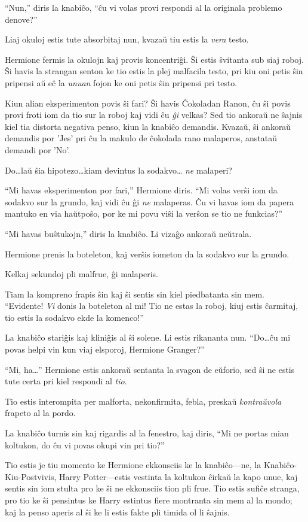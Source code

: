 ``Nun,'' diris la knabiĉo, ``ĉu vi volas provi respondi al la
originala problemo denove?''

Liaj okuloj estis tute absorbitaj nun, kvazaŭ tiu estis la \emph{vera}
testo.

Hermione fermis la okulojn kaj provis koncentriĝi. Ŝi estis ŝvitanta
sub siaj roboj. Ŝi havis la strangan senton ke tio estis la plej
malfacila testo, pri kiu oni petis ŝin pripensi aŭ eĉ la \emph{unuan}
fojon ke oni petis ŝin pripensi pri testo.

Kiun alian eksperimenton povis ŝi fari? Ŝi havis Ĉokoladan Ranon, ĉu
ŝi povis provi froti iom da tio sur la roboj kaj vidi ĉu \emph{ĝi}
velkas? Sed tio ankoraŭ ne ŝajnis kiel tia distorta negativa penso,
kiun la knabiĉo demandis. Kvazaŭ, ŝi ankoraŭ demandis por 'Jes' pri ĉu
la makulo de ĉokolada rano malaperos, anstataŭ demandi por 'No'.

Do\ldots laŭ ŝia hipotezo\ldots kiam devintus la sodakvo\ldots
\emph{ne} malaperi?

``Mi havas eksperimenton por fari,'' Hermione diris. ``Mi volas verŝi
iom da sodakvo sur la grundo, kaj vidi ĉu ĝi \emph{ne} malaperas. Ĉu
vi havas iom da papera mantuko en via haŭtpoŝo, por ke mi povu viŝi la
verŝon se tio ne funkcias?''

``Mi havas buŝtukojn,'' diris la knabiĉo. Li vizaĝo ankoraŭ neŭtrala.

Hermione prenis la boteleton, kaj verŝis iometon da la sodakvo sur la
grundo.

Kelkaj sekundoj pli malfrue, ĝi malaperis.

Tiam la kompreno frapis ŝin kaj ŝi sentis sin kiel piedbatanta sin
mem. ``Evidente! \emph{Vi} donis la boteleton al mi! Tio ne estas la
roboj, kiuj estis ĉarmitaj, tio estis la sodakvo ekde la komenco!''

La knabiĉo stariĝis kaj kliniĝis al ŝi solene. Li estis rikananta
nun. ``Do\ldots ĉu mi povas helpi vin kun viaj elsporoj, Hermione
Granger?''

``Mi, ha\ldots'' Hermione estis ankoraŭ sentanta la svagon de eŭforio,
sed ŝi ne estis tute certa pri kiel respondi al \emph{tio}.

Tio estis interompita per malforta, nekonfirmita, febla, preskaŭ
\emph{kontraŭvola} frapeto al la pordo.

La knabiĉo turnis sin kaj rigardis al la fenestro, kaj diris, ``Mi ne
portas mian koltukon, do ĉu vi povas okupi vin pri tio?''

Tio estis je tiu momento ke Hermione ekkonsciis ke la knabiĉo—ne, la
Knabiĉo-Kiu-Postvivis, Harry Potter—estis vestinta la koltukon ĉirkaŭ
la kapo unue, kaj sentis sin iom stulta pro ke ŝi ne ekkonsciis tion
pli frue. Tio estis sufiĉe stranga, pro tio ke ŝi pensintus ke Harry
estintus fiere montranta sin mem al la mondo; kaj la penso aperis al
ŝi ke li estis fakte pli timida ol li ŝajnis.

